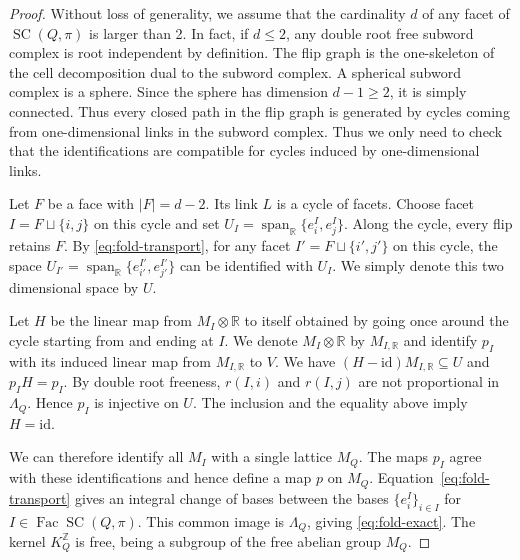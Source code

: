 \documentclass[11pt,a4paper]{article}
\theoremstyle{definition}
\theoremstyle{remark}
\newcommand{\R}{\mathbb R}
\newcommand{\SC}{\operatorname{SC}}
\newcommand{\Span}{\operatorname{span}}
\newcommand{\Fac}{\operatorname{Fac}}
\numberwithin{equation}{section}
\newcommand{\Z}{\mathbb Z}
\begin{document}
\begin{proof}
Without loss of generality, we assume that the cardinality $d$ of any facet of $\SC(Q,\pi)$ is larger than 2. In fact, if $d\leq 2$, any double root free subword complex is root independent by definition. The flip graph is the
one-skeleton of the cell decomposition dual to the subword complex. A spherical subword complex is a sphere. Since the sphere has dimension $d-1\ge2$, it is simply connected. Thus every closed path in the flip graph is generated by cycles coming from one-dimensional links in the subword complex. Thus we only need to check that the identifications are compatible for cycles induced by one-dimensional links.

Let $F$ be a face with $|F|=d-2$. Its link $L$ is a cycle of facets. Choose facet $I=F\sqcup\{i,j\}$ on this cycle and set $U_I=\Span_{\R}\{e_i^I,e_j^I\}$. Along the cycle, every flip retains $F$. By \eqref{eq:fold-transport}, for any facet $I'=F\sqcup\{i',j'\}$ on this cycle, the space $U_{I'}=\Span_{\R}\{e_{i'}^{I'},e_{j'}^{I'}\}$ can be identified with $U_I$. We simply denote this two dimensional space by $U$.

Let $H$ be the linear map from $M_I\otimes\mathbb{R}$ to itself obtained by going once around the cycle starting from and ending at $I$. We denote $M_I\otimes\mathbb{R}$ by $M_{I,\mathbb{R}}$ and identify $p_I$ with its induced linear map from $M_{I,\mathbb{R}}$ to $V$.  We have $(H-\mathrm{id})M_{I,\R}\subseteq U$ and $p_IH=p_I$.
By double root freeness, $r(I,i)$ and $r(I,j)$ are not proportional in $\Lambda_Q$. Hence $p_I$ is injective on $U$. The inclusion and the equality above imply $H=\mathrm{id}$.

We can therefore identify all $M_I$ with a single lattice $M_Q$. The maps $p_I$ agree with these identifications and hence define a map $p$ on $M_Q$. Equation~\eqref{eq:fold-transport} gives an integral change of bases between the bases $\{e^I_i\}_{i\in I}$ for $I\in \Fac\SC(Q,\pi)$. This common image is $\Lambda_Q$, giving \eqref{eq:fold-exact}.
The kernel $K_Q^{\Z}$ is free, being a subgroup of the free abelian group $M_Q$. 
\end{proof}
\end{document}
